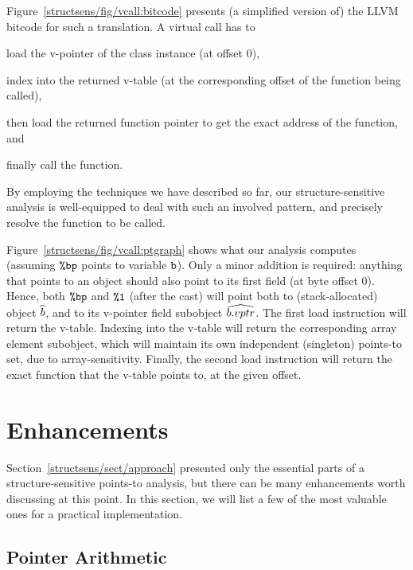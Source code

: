 Figure~\ref{structsens/fig/vcall:bitcode} presents (a simplified
version of) the LLVM bitcode for such a translation. A virtual call
has to
\begin{inparaenum}[(i)]
\item load the v-pointer of the class instance (at offset 0),
\item index into the returned v-table (at the corresponding offset of
  the function being called),
\item then load the returned function pointer to get the exact address
  of the function, and
\item finally call the function.
\end{inparaenum}
By employing the techniques we have described so far, our
structure-sensitive analysis is well-equipped to deal with such an
involved pattern, and precisely resolve the function to be called.

Figure~\ref{structsens/fig/vcall:ptgraph} shows what our analysis
computes (assuming $\texttt{\%bp}$ points to variable $\texttt{b}$). Only a
minor addition is required: anything that points to an object should
also point to its first field (at byte offset 0). Hence, both
$\texttt{\%bp}$ and $\texttt{\%1}$ (after the cast) will point both to
(stack-allocated) object $\widehat{b}$, and to its v-pointer field
subobject $\widehat{b.vptr}$. The first load instruction will return the
v-table. Indexing into the v-table will return the corresponding array
element subobject, which will maintain its own independent (singleton)
points-to set, due to array-sensitivity. Finally, the second load
instruction will return the exact function that the v-table points to,
at the given offset.


\section{Enhancements}
\label{structsens/sect/addons}

Section~\ref{structsens/sect/approach} presented only the essential
parts of a structure-sensitive points-to analysis, but there can be
many enhancements worth discussing at this point. In this section, we
will list a few of the most valuable ones for a practical
implementation.

\subsection{Pointer Arithmetic}

